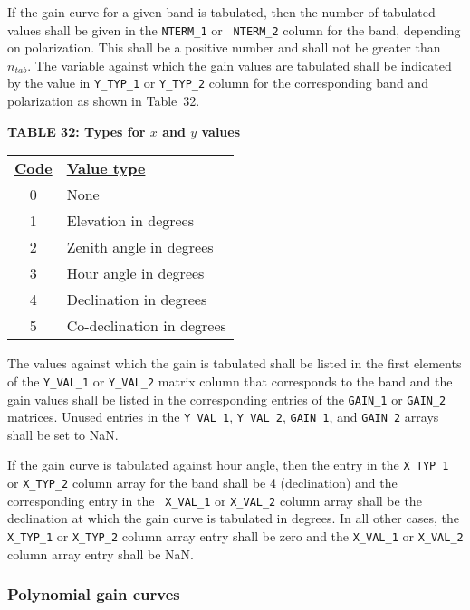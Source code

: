 \documentclass[twoside]{article}
\newcommand{\Hi}[1]{\textcolor{hicol}{#1}}
\newcommand{\ntab}{$n_{tab}$}
\begin{document}
If the gain curve for a given band is tabulated, then the number of
tabulated values shall be given in the {\tt NTERM\_1} or {\tt
  NTERM\_2} column for the band, depending on polarization.  This
shall be a positive number and shall not be greater than \ntab.  The
variable against which the gain values are tabulated shall be
indicated by the value in {\tt Y\_TYP\_1} or {\tt Y\_TYP\_2} column
for the corresponding band \Hi{and polarization} as shown in
Table~\Hi{32}.

\begin{center}
\underline{\bf{TABLE 32: Types for $x$ and $y$ values}}\\
\begin{tabular}{cl}
\noalign{\vspace{2pt}}
\underline{{\bf Code\vphantom{y}}} & \underline{\bf{Value type}} \\
\noalign{\vspace{2pt}}
 0 & None \\
 1 & Elevation in degrees \\
 2 & Zenith angle in degrees \\
 3 & Hour angle in degrees \\
 4 & Declination in degrees \\
 5 & Co-declination in degrees
\end{tabular}
\end{center}

The values against which the gain is tabulated shall be listed in the
first elements of the {\tt Y\_VAL\_1} or {\tt Y\_VAL\_2} matrix column
that corresponds to the band and the gain values shall be listed in
the corresponding entries of the {\tt GAIN\_1} or {\tt GAIN\_2}
matrices.  Unused entries in the {\tt Y\_VAL\_1}, {\tt Y\_VAL\_2},
{\tt GAIN\_1}, and {\tt GAIN\_2} arrays shall be set to NaN.

If the gain curve is tabulated against hour angle, then the entry in
the {\tt X\_TYP\_1} or {\tt X\_TYP\_2} \Hi{column array} for the band
shall be 4 (declination) and the corresponding entry in the {\tt
  X\_VAL\_1} or {\tt X\_VAL\_2} \Hi{column array} shall be the
declination at which the gain curve is tabulated in degrees.  In all
other cases, the {\tt X\_TYP\_1} or {\tt X\_TYP\_2}  \Hi{column array}
entry shall be zero and the {\tt X\_VAL\_1} or {\tt X\_VAL\_2}
\Hi{column array} entry shall be NaN.

\subsubsection{Polynomial gain curves}
\end{document}
